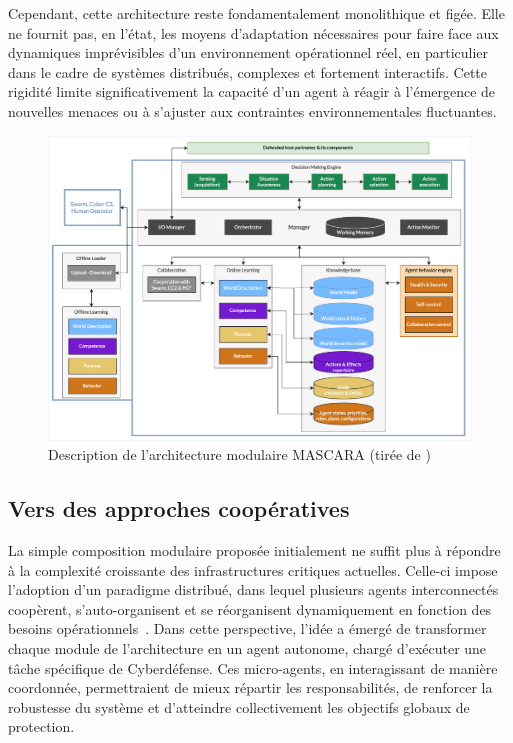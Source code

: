 Cependant, cette architecture reste fondamentalement monolithique et figée. Elle ne fournit pas, en l'état, les moyens d'adaptation nécessaires pour faire face aux dynamiques imprévisibles d'un environnement opérationnel réel, en particulier dans le cadre de systèmes distribués, complexes et fortement interactifs. Cette rigidité limite significativement la capacité d'un agent  à réagir à l'émergence de nouvelles menaces ou à s'ajuster aux contraintes environnementales fluctuantes.


\begin{figure}[h!]
  \centering
  \includegraphics[width=\linewidth]{figures/MASCARA.pdf}
  \caption{Description de l'architecture modulaire MASCARA (tirée de \autocite{Kott2023})}
  \label{fig:mascara}
\end{figure}

\subsection*{Vers des approches coopératives}

La simple composition modulaire proposée initialement ne suffit plus à répondre à la complexité croissante des infrastructures critiques actuelles. Celle-ci impose l'adoption d'un paradigme distribué, dans lequel plusieurs agents interconnectés coopèrent, s'auto-organisent et se réorganisent dynamiquement en fonction des besoins opérationnels~\cite{Ferber1999, Gleizes2008}. Dans cette perspective, l'idée a émergé de transformer chaque module de l'architecture  en un agent autonome, chargé d'exécuter une tâche spécifique de Cyberdéfense. Ces micro-agents, en interagissant de manière coordonnée, permettraient de mieux répartir les responsabilités, de renforcer la robustesse du système et d'atteindre collectivement les objectifs globaux de protection.


